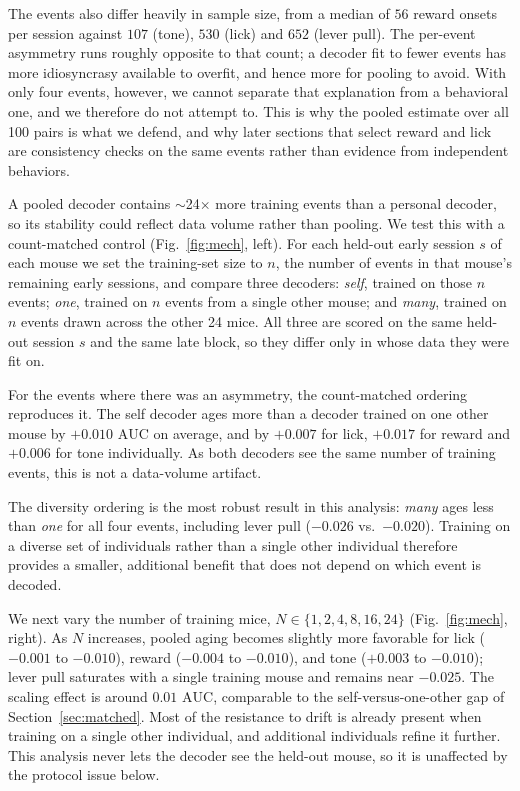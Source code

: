 \documentclass{article}
\newcommand{\auc}{\mathrm{AUC}}
\begin{document}
The events also differ heavily in sample size, from a median of $56$ reward onsets per session
against $107$ (tone), $530$ (lick) and $652$ (lever pull). The per-event asymmetry runs roughly
opposite to that count; a decoder fit to fewer events has more idiosyncrasy available to overfit, and
hence more for pooling to avoid. With only four events, however, we cannot separate that explanation from a
behavioral one, and we therefore do not attempt to. This is why the pooled estimate over all 100 pairs is what we defend, and
why later sections that select reward and lick are consistency checks on the same events rather than
evidence from independent behaviors.

A pooled decoder contains $\sim$24$\times$ more training events than a personal decoder, so its
stability could reflect data volume rather than pooling. We test this with a count-matched control
(Fig.~\ref{fig:mech}, left). For each held-out early session $s$ of each mouse we set the
training-set size to $n$, the number of events in that mouse's remaining early sessions, and compare
three decoders: \emph{self}, trained on those $n$ events; \emph{one}, trained on $n$ events from a
single other mouse; and \emph{many}, trained on $n$ events drawn across the other 24 mice. All three
are scored on the same held-out session $s$ and the same late block, so they differ only in whose
data they were fit on.

For the events where there was an asymmetry, the count-matched ordering reproduces it. The self
decoder ages more than a decoder trained on one other mouse by $+0.010$ $\auc$ on average, and by
$+0.007$ for lick, $+0.017$ for reward and $+0.006$ for tone individually. As both decoders see the
same number of training events, this is not a data-volume artifact.

The diversity ordering is the most robust result in this analysis: \emph{many} ages less than
\emph{one} for all four events, including lever pull ($-0.026$ vs.\ $-0.020$). Training on a diverse
set of individuals rather than a single other individual therefore provides a smaller, additional
benefit that does not depend on which event is decoded.

We next vary the number of training mice, $N \in \{1, 2, 4, 8, 16, 24\}$ (Fig.~\ref{fig:mech},
right). As $N$ increases, pooled aging becomes slightly more favorable for lick ($-0.001$ to
$-0.010$), reward ($-0.004$ to $-0.010$), and tone ($+0.003$ to $-0.010$); lever pull saturates with
a single training mouse and remains near $-0.025$. The scaling effect is around $0.01$ $\auc$,
comparable to the self-versus-one-other gap of Section~\ref{sec:matched}. Most of the resistance to
drift is already present when training on a single other individual, and additional individuals
refine it further. This analysis never lets the decoder see the held-out mouse, so it is unaffected
by the protocol issue below.
\end{document}
